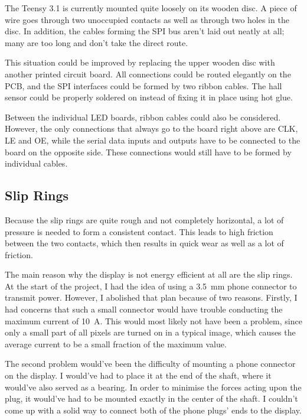\documentclass[a4paper, 11pt, titlepage]{report}
\begin{document}
The Teensy 3.1 is currently mounted quite loosely on its wooden disc. A piece of wire goes through
two unoccupied contacts as well as through two holes in the disc. In addition, the cables forming
the SPI bus aren't laid out neatly at all; many are too long and don't take the direct route.

This situation could be improved by replacing the upper wooden disc with another printed circuit
board. All connections could be routed elegantly on the PCB, and the SPI interfaces could be
formed by two ribbon cables. The hall sensor could be properly soldered on instead of fixing it in
place using hot glue.

Between the individual LED boards, ribbon cables could also be considered. However, the only
connections that always go to the board right above are CLK, LE and OE, while the serial data
inputs and outputs have to be connected to the board on the opposite side. These connections would
still have to be formed by individual cables.


\subsection{Slip Rings}

Because the slip rings are quite rough and not completely horizontal, a lot of pressure is needed
to form a consistent contact. This leads to high friction between the two contacts, which then
results in quick wear as well as a lot of friction.

The main reason why the display is not energy efficient at all are the slip rings. At the start of
the project, I had the idea of using a \SI{3.5}{\milli\meter} phone connector to transmit power.
However, I abolished that plan because of two reasons. Firstly, I had concerns that such a small
connector would have trouble conducting the maximum current of \SI{10}{\ampere}. This would most
likely not have been a problem, since only a small part of all pixels are turned on in a typical
image, which causes the average current to be a small fraction of the maximum value.

The second problem would've been the difficulty of mounting a phone connector on the display. I
would've had to place it at the end of the shaft, where it would've also served as a bearing. In
order to minimise the forces acting upon the plug, it would've had to be mounted exactly in the
center of the shaft. I couldn't come up with a solid way to connect both of the phone plugs' ends
to the display.
\end{document}
